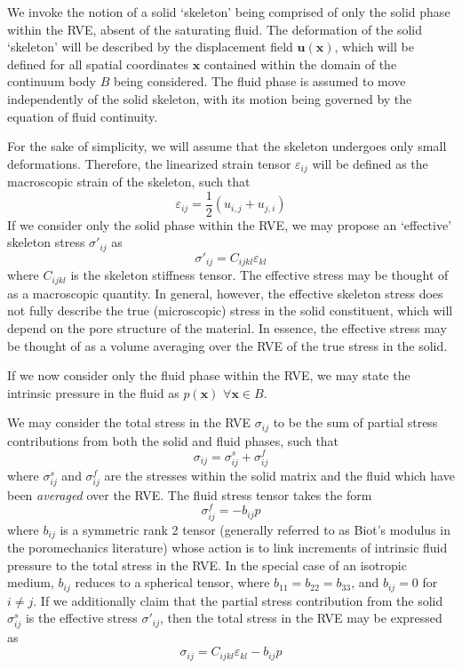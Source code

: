 \documentclass[11pt]{article} %
\begin{document}
We invoke the notion of a solid `skeleton' being comprised of only the solid phase within the RVE, absent of the saturating fluid. The deformation of the solid `skeleton' will be described by the displacement field $\mathbf{u}(\mathbf{x})$, which will be defined for all spatial coordinates $\mathbf{x}$ contained within the domain of the continuum body $B$ being considered. The fluid phase is assumed to move independently of the solid skeleton, with its motion being governed by the equation of fluid continuity.

For the sake of simplicity, we will assume that the skeleton undergoes only small deformations. Therefore, the linearized strain tensor $\varepsilon_{ij}$ will be defined as the macroscopic strain of the skeleton, such that
\begin{equation}
	\varepsilon_{ij} = \frac{1}{2} (u_{i,j} + u_{j,i})
\end{equation}
If we consider only the solid phase within the RVE, we may propose an `effective' skeleton stress $\sigma'_{ij}$ as
\begin{equation}
	\sigma'_{ij} = C_{ijkl} \varepsilon_{kl}
\end{equation}
where $C_{ijkl}$ is the skeleton stiffness tensor. The effective stress may be thought of as a macroscopic quantity. In general, however, the effective skeleton stress does not fully describe the true (microscopic) stress in the solid constituent, which will depend on the pore structure of the material. In essence, the effective stress may be thought of as a volume averaging over the RVE of the true stress in the solid.

If we now consider only the fluid phase within the RVE, we may state the intrinsic pressure in the fluid as $p(\textbf{x})$ $\forall \textbf{x} \in B$. 

We may consider the total stress in the RVE $\sigma_{ij}$ to be the sum of partial stress contributions from both the solid and fluid phases, such that
\begin{equation}
	\sigma_{ij} = \sigma_{ij}^s + \sigma_{ij}^f
\end{equation}
where $\sigma_{ij}^s$ and $\sigma_{ij}^f$ are the stresses within the solid matrix and the fluid which have been \textit{averaged} over the RVE. The fluid stress tensor takes the form
\begin{equation}
	\sigma_{ij}^f = -b_{ij} p
\end{equation}
where $b_{ij}$ is a symmetric rank 2 tensor (generally referred to as Biot's modulus in the poromechanics literature) whose action is to link increments of intrinsic fluid pressure to the total stress in the RVE. In the special case of an isotropic medium, $b_{ij}$ reduces to a spherical tensor, where $b_{11} = b_{22} = b_{33}$, and $b_{ij} = 0$ for $i \neq j$. If we additionally claim that the partial stress contribution from the solid $\sigma_{ij}^s$ is the effective stress $\sigma'_{ij}$, then the total stress in the RVE may be expressed as
\begin{equation}
	\sigma_{ij} = C_{ijkl} \varepsilon_{kl} - b_{ij} p
\end{equation}
\end{document}
